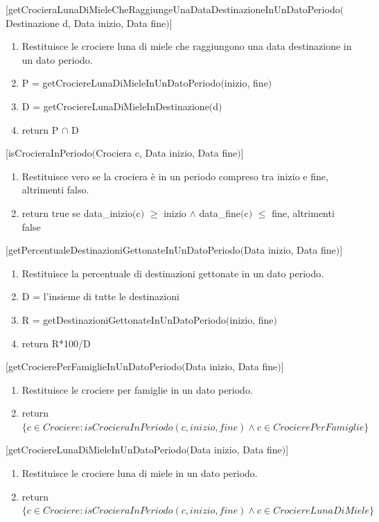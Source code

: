\documentclass{article}
\begin{document}
[getCrocieraLunaDiMieleCheRaggiungeUnaDataDestinazioneInUnDatoPeriodo$($Destinazione d, Data inizio, Data fine$)$]
\begin{enumerate}
    \item Restituisce le crociere luna di miele che raggiungono una data destinazione in un dato periodo.
    \item P = getCrociereLunaDiMieleInUnDatoPeriodo$($inizio, fine$)$
    \item D = getCrociereLunaDiMieleInDestinazione$($d$)$
    \item return P $\cap$ D
\end{enumerate}
\space

[isCrocieraInPeriodo$($Crociera c, Data inizio, Data fine$)$]
\begin{enumerate}
    \item Restituisce vero se la crociera è in un periodo compreso tra inizio e fine, altrimenti falso.
    \item return true se data\_inizio$($c$)$ $\geq$ inizio $\land$ data\_fine$($c$)$ $\leq$ fine, altrimenti false
\end{enumerate}
\space

[getPercentualeDestinazioniGettonateInUnDatoPeriodo$($Data inizio, Data fine$)$]
\begin{enumerate}
    \item Restituisce la percentuale di destinazioni gettonate in un dato periodo.
    \item D = l'insieme di tutte le destinazioni
    \item R = getDestinazioniGettonateInUnDatoPeriodo$($inizio, fine$)$
    \item return R*100/D
\end{enumerate}
\space

[getCrocierePerFamiglieInUnDatoPeriodo$($Data inizio, Data fine$)$]
\begin{enumerate}
    \item Restituisce le crociere per famiglie in un dato periodo.
    \item return $\{c \in Crociere: isCrocieraInPeriodo(c, inizio, fine) \land c \in CrocierePerFamiglie\}$
\end{enumerate}
\space

[getCrociereLunaDiMieleInUnDatoPeriodo$($Data inizio, Data fine$)$]
\begin{enumerate}
    \item Restituisce le crociere luna di miele in un dato periodo.
    \item return $\{c \in Crociere: isCrocieraInPeriodo(c, inizio, fine) \land c \in CrociereLunaDiMiele\}$
\end{enumerate}
\space
\end{document}
